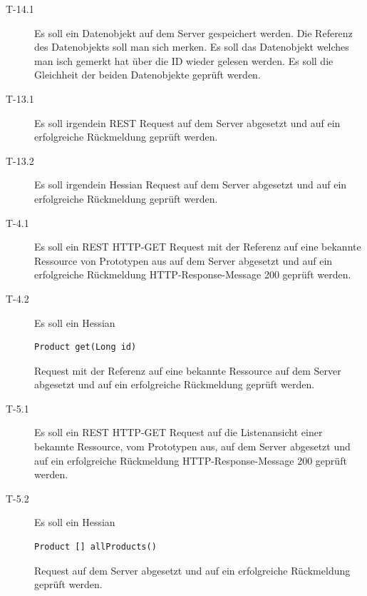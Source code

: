 \documentclass[abstracton, listof=totocnumbered,
bibliography=totocnumbered]{scrreprt}
\begin{document}
  \begin{description}

    \item[T-14.1] Es soll ein Datenobjekt auf dem Server gespeichert werden.
    Die Referenz des Datenobjekts soll man sich merken. Es soll das Datenobjekt
    welches man isch gemerkt hat über die ID wieder gelesen werden. Es soll die
    Gleichheit der beiden Datenobjekte geprüft werden.
    \newline

    \item[T-13.1] Es soll irgendein \ac{REST} Request auf dem Server abgesetzt
    und auf ein erfolgreiche Rückmeldung geprüft werden.
    \newline
    
    \item[T-13.2] Es soll irgendein Hessian Request auf dem Server abgesetzt
    und auf ein erfolgreiche Rückmeldung geprüft werden.
    \newline
    
    \item[T-4.1] Es soll ein \ac{REST} HTTP-GET Request mit der Referenz
    auf eine bekannte Ressource von Prototypen aus auf dem Server abgesetzt und
    auf ein erfolgreiche Rückmeldung HTTP-Response-Message 200 geprüft werden.
    \newline
    
    \item[T-4.2] Es soll ein Hessian 
    \begin{verbatim}Product get(Long id)\end{verbatim} 
    Request mit der Referenz auf eine bekannte Ressource auf dem Server
    abgesetzt und auf ein erfolgreiche Rückmeldung geprüft werden.
    \newline
    
    \item[T-5.1] Es soll ein \ac{REST} HTTP-GET Request auf die
    Listenansicht einer bekannte Ressource, vom Prototypen aus, auf dem Server
    abgesetzt und auf ein erfolgreiche Rückmeldung HTTP-Response-Message 200
    geprüft werden.
    \newline
    
    \item[T-5.2] Es soll ein Hessian 
    \begin{verbatim}Product [] allProducts()\end{verbatim}
    Request auf dem Server abgesetzt und auf ein erfolgreiche Rückmeldung
    geprüft werden.
    \newline
    

\end{description}
\end{document}
